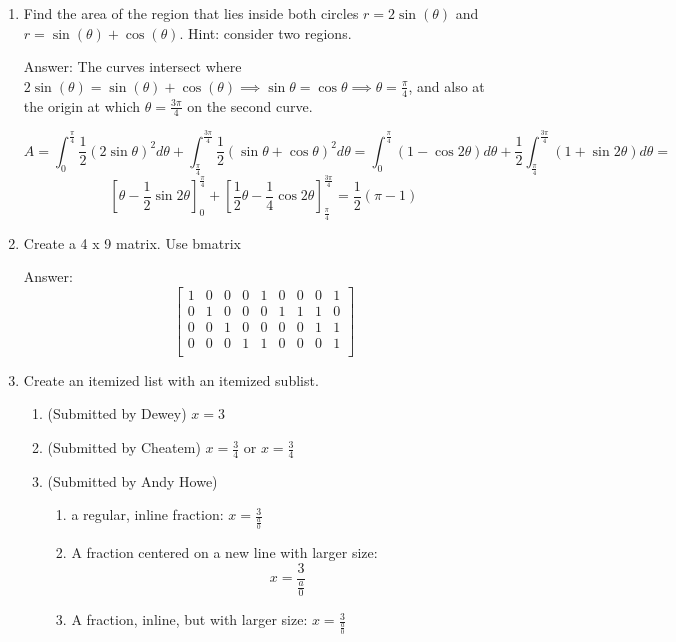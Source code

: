 \documentclass{article}
\begin{document}
\begin{enumerate}
\item
Find the area of the region that lies inside both circles $r=2\sin(\theta)$ and $r=\sin(\theta)+\cos(\theta)$. Hint: consider two regions.

Answer:
The curves intersect where $2\sin(\theta)=\sin(\theta)+\cos(\theta)\implies \sin\theta=\cos\theta\implies\theta=\frac{\pi}{4}$, and also at the origin at which $\theta=\frac{3\pi}{4}$ on the second curve.

$$A=\int_{0}^{\frac{\pi}{4}}\frac{1}{2}(2\sin\theta)^2 d\theta+\int_{\frac{\pi}{4}}^{\frac{3\pi}{4}}\frac{1}{2}(\sin\theta+\cos\theta)^2 d\theta = \int_{0}^{\frac{\pi}{4}}(1-\cos2\theta) d\theta+\frac{1}{2}\int_{\frac{\pi}{4}}^{\frac{3\pi}{4}}(1+\sin2\theta) d\theta = $$ 
$$ [\theta-\frac{1}{2}\sin2\theta]^{\frac{\pi}{4}}_0+[\frac{1}{2}\theta-\frac{1}{4}\cos2\theta]^{\frac{3\pi}{4}}_{\frac{\pi}{4}} = \frac{1}{2}(\pi-1)$$

\item
Create a 4 x 9 matrix. Use bmatrix

Answer:
$$\begin{bmatrix}
    1 & 0 & 0 & 0 & 1 & 0 & 0 & 0 & 1 \\
    0 & 1 & 0 & 0 & 0 & 1 & 1 & 1 & 0 \\
    0 & 0 & 1 & 0 & 0 & 0 & 0 & 1 & 1 \\
    0 & 0 & 0 & 1 & 1 & 0 & 0 & 0 & 1 \\
    \end{bmatrix}$$
    
\item
Create an itemized list with an itemized sublist.

    \begin{enumerate}
        \item (Submitted by Dewey) $x=3$
        \item (Submitted by Cheatem) $x=\frac{3}{4}$ or $x=\frac{3}{4}$
        \item (Submitted by Andy Howe)
        \begin{enumerate}
            \item a regular, inline fraction: $x=\frac{3}{\frac{a}{0}}$
            \item A fraction centered on a new line with larger size:
            \large$$x=\frac{3}{\frac{a}{0}}$$
            \item A fraction, inline, but with larger size: \large$x=\frac{3}{\frac{a}{0}}$
    \end{enumerate}
   \end{enumerate}


\end{enumerate}
\end{document}
